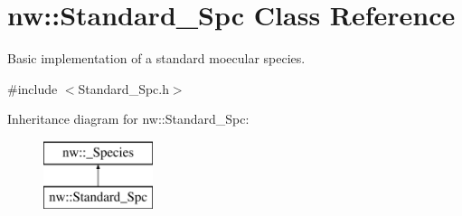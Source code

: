\hypertarget{classnw_1_1_standard___spc}{\section{nw\+:\+:Standard\+\_\+\+Spc Class Reference}
\label{classnw_1_1_standard___spc}
}


Basic implementation of a standard moecular species.  




{\ttfamily \#include $<$Standard\+\_\+\+Spc.\+h$>$}

Inheritance diagram for nw\+:\+:Standard\+\_\+\+Spc\+:\begin{figure}[H]
\begin{center}
\leavevmode
\includegraphics[height=2.000000cm]{da/d48/classnw_1_1_standard___spc}
\end{center}
\end{figure}

